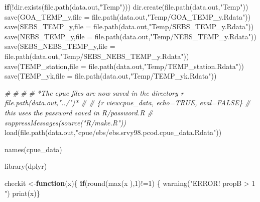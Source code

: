 \documentclass[
]{article}
\newenvironment{Shaded}{\begin{snugshade}}{\end{snugshade}}
\newcommand{\AttributeTok}[1]{\textcolor[rgb]{0.77,0.63,0.00}{#1}}
\newcommand{\CommentTok}[1]{\textcolor[rgb]{0.56,0.35,0.01}{\textit{#1}}}
\newcommand{\ControlFlowTok}[1]{\textcolor[rgb]{0.13,0.29,0.53}{\textbf{#1}}}
\newcommand{\DecValTok}[1]{\textcolor[rgb]{0.00,0.00,0.81}{#1}}
\newcommand{\FunctionTok}[1]{\textcolor[rgb]{0.00,0.00,0.00}{#1}}
\newcommand{\NormalTok}[1]{#1}
\newcommand{\OtherTok}[1]{\textcolor[rgb]{0.56,0.35,0.01}{#1}}
\newcommand{\SpecialCharTok}[1]{\textcolor[rgb]{0.00,0.00,0.00}{#1}}
\newcommand{\StringTok}[1]{\textcolor[rgb]{0.31,0.60,0.02}{#1}}
\begin{document}
\begin{Shaded}
\begin{Highlighting}[]
  
  \ControlFlowTok{if}\NormalTok{(}\SpecialCharTok{!}\FunctionTok{dir.exists}\NormalTok{(}\FunctionTok{file.path}\NormalTok{(data.out,}\StringTok{"Temp"}\NormalTok{)))}
    \FunctionTok{dir.create}\NormalTok{(}\FunctionTok{file.path}\NormalTok{(data.out,}\StringTok{"Temp"}\NormalTok{))}
  \FunctionTok{save}\NormalTok{(GOA\_TEMP\_y,}\AttributeTok{file =} \FunctionTok{file.path}\NormalTok{(data.out,}\StringTok{"Temp/GOA\_TEMP\_y.Rdata"}\NormalTok{))}
  \FunctionTok{save}\NormalTok{(SEBS\_TEMP\_y,}\AttributeTok{file =} \FunctionTok{file.path}\NormalTok{(data.out,}\StringTok{"Temp/SEBS\_TEMP\_y.Rdata"}\NormalTok{))}
  \FunctionTok{save}\NormalTok{(NEBS\_TEMP\_y,}\AttributeTok{file =} \FunctionTok{file.path}\NormalTok{(data.out,}\StringTok{"Temp/NEBS\_TEMP\_y.Rdata"}\NormalTok{))}
  \FunctionTok{save}\NormalTok{(SEBS\_NEBS\_TEMP\_y,}\AttributeTok{file =} \FunctionTok{file.path}\NormalTok{(data.out,}\StringTok{"Temp/SEBS\_NEBS\_TEMP\_y.Rdata"}\NormalTok{))}
  \FunctionTok{save}\NormalTok{(TEMP\_station,}\AttributeTok{file =} \FunctionTok{file.path}\NormalTok{(data.out,}\StringTok{"Temp/TEMP\_station.Rdata"}\NormalTok{))}
  \FunctionTok{save}\NormalTok{(TEMP\_yk,}\AttributeTok{file =} \FunctionTok{file.path}\NormalTok{(data.out,}\StringTok{"Temp/TEMP\_yk.Rdata"}\NormalTok{))}
  
  
\CommentTok{\#}
\CommentTok{\# \textasciigrave{}\textasciigrave{}\textasciigrave{}}
\CommentTok{\# }
\CommentTok{\# *The cpue files are now saved in the directory \textasciigrave{}r file.path(data.out,"../")\textasciigrave{}*}
\CommentTok{\# }
\CommentTok{\# \textasciigrave{}\textasciigrave{}\textasciigrave{}\{r viewcpue\_data, echo=TRUE, eval=FALSE\} }
  \CommentTok{\# this uses the password saved in R/password.R}
  \CommentTok{\#  suppressMessages(source("R/make.R"))}
\FunctionTok{load}\NormalTok{(}\FunctionTok{file.path}\NormalTok{(data.out,}\StringTok{"cpue/ebs/ebs.srvy98.pcod.cpue\_data.Rdata"}\NormalTok{))}

\FunctionTok{names}\NormalTok{(cpue\_data)}

\FunctionTok{library}\NormalTok{(dplyr)}

\NormalTok{checkit }\OtherTok{\textless{}{-}}\ControlFlowTok{function}\NormalTok{(x)\{}
   \ControlFlowTok{if}\NormalTok{(}\FunctionTok{round}\NormalTok{(}\FunctionTok{max}\NormalTok{(x ),}\DecValTok{1}\NormalTok{)}\SpecialCharTok{!=}\DecValTok{1}\NormalTok{) \{}
     \FunctionTok{warning}\NormalTok{(}\StringTok{"ERROR! propB \textgreater{} 1 "}\NormalTok{)}
     \FunctionTok{print}\NormalTok{(x)\}}
  

\end{Highlighting}
\end{Shaded}
\end{document}
